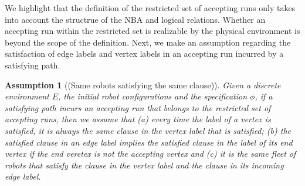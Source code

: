 \documentclass[Afour,sageh,times]{sagej}
\newtheorem{asmp}[thm]{Assumption}
\newcommand{\vertex}[1]{v_{\textup{#1}}}
\newcommand{\simplies}{\DOTSB\Longrightarrow}
\renewcommand{\ap}[3]{\mathcal{\pi}_{{#1},{#2}}^{#3}}
\begin{document}


We highlight that the definition of the restricted set of accepting runs only takes into account the structrue of the  NBA and logical relations. Whether an accepting run within the restricted set is realizable by the physical environment is beyond the scope of the definition.
Next, we make an assumption regarding the satisfaction of edge labels and vertex labels in an accepting run incurred by a satisfying path.
\begin{asmp}[(Same robots satisfying the same clause)]\label{asmp:same}
  Given a discrete environment $E$, the initial robot configurations and the specification $\phi$, if a satisfying path incurs an accepting run that belongs to the restricted set of accepting runs, then we assume that (a)\label{asmp:a} every time the label of a vertex is satisfied, it is always the same clause in the vertex label that is satisfied; (b)\label{asmp:b} the satisfied clause in an edge label  implies the  satisfied clause in the label of its end vertex if the end veretex is not the accepting vertex and (c)\label{asmp:c} it is the same fleet of robots that satisfy the  clause in the vertex label  and the clause in its incoming edge label.
\end{asmp}
\end{document}
